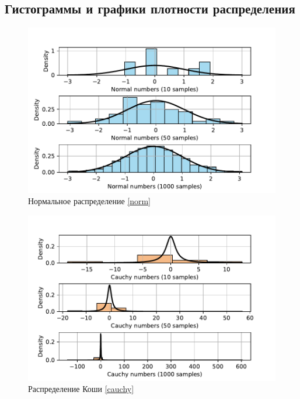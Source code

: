 \documentclass[a4paper]{article}
\begin{document}
\subsection{Гистограммы и графики плотности распределения}
\begin{figure}[H]
    \centering
    \includegraphics[width = 16 cm]{sources/normalNumbers.pdf}
    \caption{Нормальное распределение \eqref{norm}}
    \label{fig:norm}
\end{figure}
\begin{figure}[H]
    \centering
    \includegraphics[width = 16 cm]{sources/cauchyNumbers.pdf}
    \caption{Распределение Коши \eqref{cauchy}}
    \label{fig:cauchy}
\end{figure}
\end{document}
